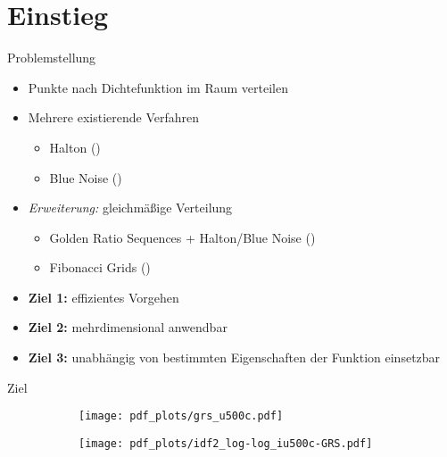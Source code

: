 \section{Einstieg}

\begin{frame}{Problemstellung}
	\begin{itemize}
		\item Punkte nach Dichtefunktion im Raum verteilen
		\item<2-> Mehrere existierende Verfahren
		\begin{itemize}
			\item Halton \small(\cite{wong_luk_heng-halton_points_sampling-1997})\normalsize
			\item Blue Noise \small(\cite{yan-blue_noise_sampling-2015})\normalsize
		\end{itemize}
		\item<3-> \textit{Erweiterung:} gleichmäßige Verteilung
		\begin{itemize}
			\item Golden Ratio Sequences + Halton/Blue Noise \small(\cite{schretter-golden_ratio_sequences-2012})\normalsize
			\item Fibonacci Grids \small(\cite{frisch_hanebeck-deterministic_gaussian_sampling-2021})\normalsize
		\end{itemize}
		\item<4->\textbf{Ziel 1:} effizientes Vorgehen 
		\item<5->\textbf{Ziel 2:} mehrdimensional anwendbar
		\item<6->\textbf{Ziel 3:} unabhängig von bestimmten Eigenschaften der Funktion einsetzbar
	\end{itemize}
\end{frame}

\begin{frame}{Ziel}
	\begin{figure}
		\begin{subfigure}{.45\textwidth}
			\centering
			\texttt{[image: pdf\_plots/grs\_u500c.pdf]}
		\end{subfigure}
		\begin{subfigure}{.45\textwidth}
			\centering
			\texttt{[image: pdf\_plots/idf2\_log-log\_iu500c-GRS.pdf]}
		\end{subfigure}
		\caption{\small\cite{schretter-golden_ratio_sequences-2012}\normalsize}
	\end{figure}
\end{frame}